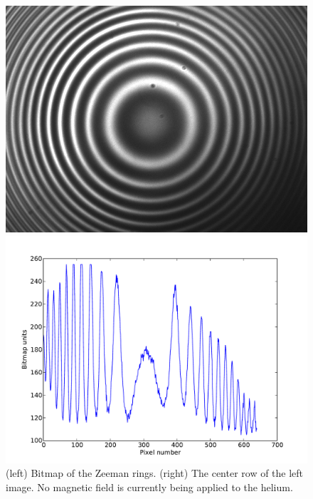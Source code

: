 \documentclass[11pt,letterpaper]{article}
\begin{document}
\begin{figure}
    \centering
    \begin{minipage}[t]{0.45\textwidth}
        \centering
        \includegraphics[width=\textwidth]{figures/0V.png}
    \end{minipage}
    \hspace{0.5em}
    \begin{minipage}[t]{0.45\textwidth}
        \centering
        \includegraphics[width=\textwidth]{figures/zeeman_center.pdf}
    \end{minipage}
    \caption{(left) Bitmap of the Zeeman rings. (right) The center row of the
    left image. No magnetic field is currently being applied to the helium.}
    \label{nofield}
\end{figure}
\end{document}
